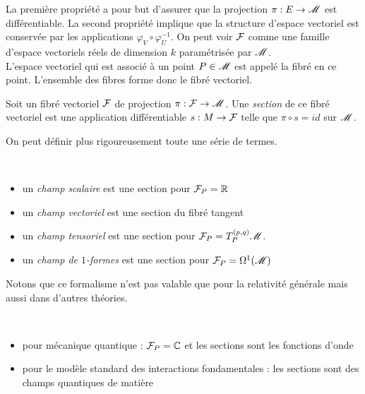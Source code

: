 \documentclass[a4paper,11pt]{report}
\begin{document}
                La première propriété a pour but d'assurer que la projection $\pi:E\to\mathscr{M}$ est différentiable. La second propriété implique que la structure d'espace vectoriel est conservée par les applications $\varphi_V\circ\varphi_U^{-1}$. On peut voir $\mathcal{F}$ comme une famille d'espace vectoriels réels de dimension $k$ paramétrisée par $\mathscr{M}$.\\
                
                L'espace vectoriel qui est associé à un point $P\in\mathscr{M}$ est appelé la fibré en ce point. L'ensemble des fibres forme donc le fibré vectoriel.
                
                \begin{defn}
                    Soit un fibré vectoriel $\mathcal{F}$ de projection $\pi:\mathcal{F}\to\mathscr{M}$. Une \textit{section} de ce fibré vectoriel est une application différentiable $s:M\to\mathcal{F}$ telle que $\pi\circ s = id$ sur $\mathscr{M}$.
                \end{defn}
                
                On peut définir plus rigoureusement toute une série de termes.
                \begin{defn}${}$
                    \begin{itemize}[label = \textbullet]
                        \item un \textit{champ scalaire} est une section pour $\mathcal{F}_P = \mathbb{R}$
                        \item un \textit{champ vectoriel} est une section du fibré tangent
                        \item un \textit{champ tensoriel} est une section pour $\mathcal{F}_P = T_P^{(p,q)}\mathscr{M}$.
                        \item un \textit{champ de $1$-formes} est une section pour $\mathcal{F}_P = \Omega^1(\mathscr{M})$
                    \end{itemize}
                \end{defn}
                
                Notons que ce formalisme n'est pas valable que pour la relativité générale mais aussi dans d'autres théories.
                
                \begin{exmp}${}$
                    \begin{itemize}[label = \textbullet]
                        \item pour mécanique quantique : $\mathcal{F}_P = \mathbb{C}$ et les sections sont les fonctions d'onde
                        \item pour le modèle standard des interactions fondamentales : les sections sont des champs quantiques de matière
                    \end{itemize}
                \end{exmp}
                
\end{document}
